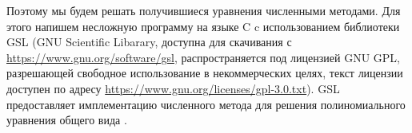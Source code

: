 \documentclass[12pt]{article}
\begin{document}
    \par Поэтому мы будем решать получившиеся уравнения численными методами. Для
    этого напишем несложную программу на языке C c использованием библиотеки 
    GSL (GNU Scientific Libarary, доступна для скачивания 
    с \url{https://www.gnu.org/software/gsl}, распространяется под лицензией 
    GNU GPL, разрешающей свободное использование в
    некоммерческих целях, текст лицензии доступен по адресу 
    \url{https://www.gnu.org/licenses/gpl-3.0.txt}). GSL предоставляет
    имплементацию численного метода для решения полиномиального уравнения
    общего вида \cite{gsl}.

    
    
\end{document}

